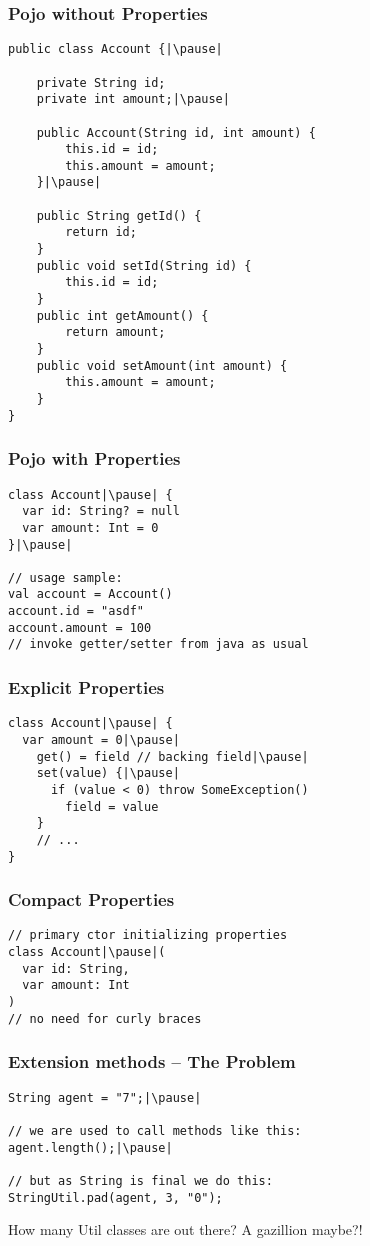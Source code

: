 
\begin{frame}[fragile] \frametitle{Pojo without Properties}
\pause
\begin{lstlisting}[basicstyle=\color{IJ_text}\ttfamily\tiny]
public class Account {|\pause|
    
    private String id;
    private int amount;|\pause|

    public Account(String id, int amount) {
        this.id = id;
        this.amount = amount;
    }|\pause|

    public String getId() {
        return id;
    }
    public void setId(String id) {
        this.id = id;
    }
    public int getAmount() {
        return amount;
    }
    public void setAmount(int amount) {
        this.amount = amount;
    }
}
\end{lstlisting}
\end{frame}

\begin{frame}[fragile] \frametitle{Pojo with Properties}
\pause
\begin{lstlisting}
class Account|\pause| {
  var id: String? = null
  var amount: Int = 0
}|\pause|

// usage sample:
val account = Account()
account.id = "asdf"
account.amount = 100
// invoke getter/setter from java as usual
\end{lstlisting}
\end{frame}

\begin{frame}[fragile] \frametitle{Explicit Properties}
\begin{lstlisting}
class Account|\pause| {
  var amount = 0|\pause|
    get() = field // backing field|\pause|
    set(value) {|\pause|
      if (value < 0) throw SomeException()
        field = value
    }
    // ...
}
\end{lstlisting}
\end{frame}

\begin{frame}[fragile] \frametitle{Compact Properties}
\pause
\begin{lstlisting}
// primary ctor initializing properties
class Account|\pause|(
  var id: String,
  var amount: Int
)
// no need for curly braces
\end{lstlisting}
\end{frame}


\begin{frame}[fragile] \frametitle{Extension methods -- The Problem}
\pause
\begin{lstlisting}
String agent = "7";|\pause|

// we are used to call methods like this:
agent.length();|\pause|

// but as String is final we do this:
StringUtil.pad(agent, 3, "0");
\end{lstlisting}
\pause
How many Util classes are out there? A gazillion maybe?!
\end{frame}

